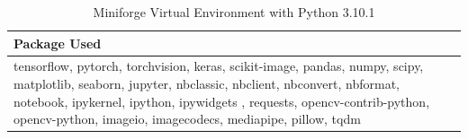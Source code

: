 \documentclass[conference]{IEEEtran}
\begin{document}
            \begin{table}[]
                \caption{Miniforge Virtual Environment with Python 3.10.1}
                \centering
                \begin{tabular}{|p{7.4cm}|}
                    \hline
                    Package Used\\
                    \hline
                    tensorflow, pytorch, torchvision, keras,  scikit-image, pandas, numpy, scipy, matplotlib, seaborn, jupyter, nbclassic, nbclient, nbconvert, nbformat, notebook, ipykernel, ipython, ipywidgets , requests, opencv-contrib-python, opencv-python, imageio, imagecodecs, mediapipe, pillow, tqdm\\
                    \hline
                \end{tabular}
            \end{table}
            
\end{document}

